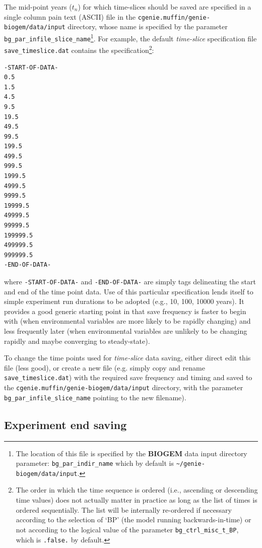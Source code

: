 \documentclass[11pt,fleqn]{book} %
\begin{document}
\vspace{1mm}The mid-point years (\begin{math}t_{n}\end{math}) for which time-slices should be saved are specified in a single column pain text (ASCII) file in the \texttt{cgenie.muffin/genie-biogem/data/input} directory, whose name is specified by the parameter \texttt{bg\_par\_infile\_slice\_name}\footnote{The location of this file is specified by the \textbf{BIOGEM} data input directory parameter: \texttt{bg\_par\_indir\_name} which by default is \texttt{\~{}/genie-biogem/data/input}.}.
For example, the default \textit{time-slice} specification file \texttt{save\_timeslice.dat} contains the specification\footnote{The order in which the time sequence is ordered (i.e., ascending or descending time values) does not actually matter in practice as long as the list of times is ordered sequentially. The list will be internally re-ordered if necessary according to the selection of ‘BP’ (the model running backwards-in-time) or not according to the logical value of the parameter \texttt{bg\_ctrl\_misc\_t\_BP}, which is \texttt{.false.} by default.}:
\footnotesize\begin{verbatim}
-START-OF-DATA-
0.5
1.5
4.5
9.5
19.5
49.5
99.5
199.5
499.5
999.5
1999.5
4999.5
9999.5
19999.5
49999.5
99999.5
199999.5
499999.5
999999.5
-END-OF-DATA-
\end{verbatim}\normalsize
where \texttt{-START-OF-DATA-} and \texttt{-END-OF-DATA-} are simply tags delineating the start and end of the time point data.
Use of this particular specification lends itself to simple experiment run durations to be adopted (e.g., 10, 100, 10000 years). It provides a good generic starting point in that save frequency is faster to begin with (when environmental variables are more likely to be rapidly changing) and less frequently later (when environmental variables are unlikely to be changing rapidly and maybe converging to steady-state).

To change the time points used for \textit{time-slice} data saving, either direct edit this file (less good), or create a new file (e.g. simply copy and rename \texttt{save\_timeslice.dat}) with the required save frequency and timing and saved to the \texttt{cgenie.muffin/genie-biogem/data/input} directory, with the parameter \texttt{bg\_par\_infile\_slice\_name} pointing to the new filename).


\subsection{Experiment end saving}
\end{document}
